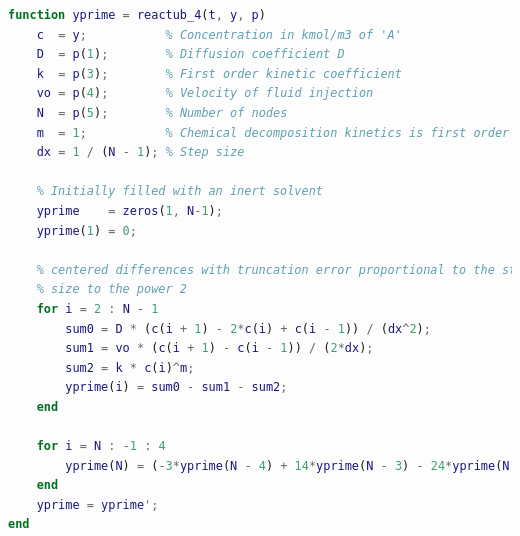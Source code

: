 \documentclass{article}
\begin{document}
\begin{lstlisting}[language=Matlab, caption=reactub4]
%% TUBULAR REACTOR adapted from (jose lopez salinas)'s solution
function yprime = reactub_4(t, y, p)
    c  = y;           % Concentration in kmol/m3 of 'A'
    D  = p(1);        % Diffusion coefficient D
    k  = p(3);        % First order kinetic coefficient
    vo = p(4);        % Velocity of fluid injection
    N  = p(5);        % Number of nodes
    m  = 1;           % Chemical decomposition kinetics is first order
    dx = 1 / (N - 1); % Step size
    
    % Initially filled with an inert solvent
    yprime    = zeros(1, N-1);
    yprime(1) = 0;
    
    % centered differences with truncation error proportional to the step
    % size to the power 2
    for i = 2 : N - 1
        sum0 = D * (c(i + 1) - 2*c(i) + c(i - 1)) / (dx^2);
        sum1 = vo * (c(i + 1) - c(i - 1)) / (2*dx);
        sum2 = k * c(i)^m;
        yprime(i) = sum0 - sum1 - sum2;
    end
    
    for i = N : -1 : 4
        yprime(N) = (-3*yprime(N - 4) + 14*yprime(N - 3) - 24*yprime(N - 2) + 18*yprime(N - 1)) / 5;
    end
    yprime = yprime';
end
\end{lstlisting}

\printbibliography[title={References}]
\end{document}
